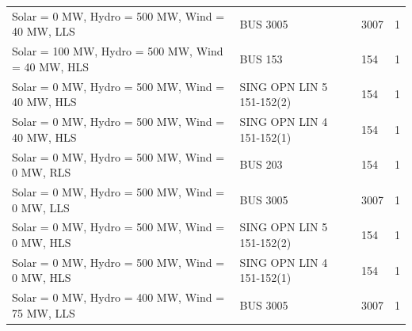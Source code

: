 \documentclass[10pt]{report}
\begin{document}
\begin{table}[H]
{\begin{tabular}{llp{8cm}r}
Solar = 0 MW, Hydro = 500 MW, Wind = 40 MW, LLS & BUS 3005 & 3007 & 1 \\
Solar = 100 MW, Hydro = 500 MW, Wind = 40 MW, HLS & BUS 153 & 154 & 1 \\
Solar = 0 MW, Hydro = 500 MW, Wind = 40 MW, HLS & SING OPN LIN   5 151-152(2) & 154 & 1 \\
Solar = 0 MW, Hydro = 500 MW, Wind = 40 MW, HLS & SING OPN LIN   4 151-152(1) & 154 & 1 \\
Solar = 0 MW, Hydro = 500 MW, Wind = 0 MW, RLS & BUS 203 & 154 & 1 \\
Solar = 0 MW, Hydro = 500 MW, Wind = 0 MW, LLS & BUS 3005 & 3007 & 1 \\
Solar = 0 MW, Hydro = 500 MW, Wind = 0 MW, HLS & SING OPN LIN   5 151-152(2) & 154 & 1 \\
Solar = 0 MW, Hydro = 500 MW, Wind = 0 MW, HLS & SING OPN LIN   4 151-152(1) & 154 & 1 \\
Solar = 0 MW, Hydro = 400 MW, Wind = 75 MW, LLS & BUS 3005 & 3007 & 1 \\
\bottomrule
\end{tabular}}
\end{table}
\end{document}
